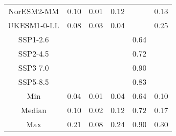 \begin{table*}[t]
\begin{tabular}{c|rrr|rr}
NorESM2-MM & 0.10 & 0.01 & 0.12 &  & 0.13 \\
UKESM1-0-LL & 0.08 & 0.03 & 0.04 &  & 0.25 \\
SSP1-2.6 &  &  &  & 0.64 &  \\
SSP2-4.5 &  &  &  & 0.72 &  \\
SSP3-7.0 &  &  &  & 0.90 &  \\
SSP5-8.5 &  &  &  & 0.83 &  \\
\midrule
Min & 0.04 & 0.01 & 0.04 & 0.64 & 0.10 \\
Median & 0.10 & 0.02 & 0.12 & 0.72 & 0.17 \\
Max & 0.21 & 0.08 & 0.24 & 0.90 & 0.30 \\
\bottomrule
\end{tabular}
\end{table*}
